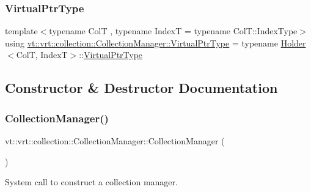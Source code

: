 \subsubsection{\texorpdfstring{Virtual\+Ptr\+Type}{VirtualPtrType}}
{\footnotesize\ttfamily template$<$typename ColT , typename IndexT  = typename Col\+T\+::\+Index\+Type$>$ \\
using \hyperlink{structvt_1_1vrt_1_1collection_1_1_collection_manager_a1da9015e52d6ecca955f57b59aab0b82}{vt\+::vrt\+::collection\+::\+Collection\+Manager\+::\+Virtual\+Ptr\+Type} =  typename \hyperlink{structvt_1_1vrt_1_1collection_1_1_holder}{Holder}$<$ColT, IndexT$>$\+::\hyperlink{structvt_1_1vrt_1_1collection_1_1_collection_manager_a1da9015e52d6ecca955f57b59aab0b82}{Virtual\+Ptr\+Type}}



\subsection{Constructor \& Destructor Documentation}
\mbox{\label{structvt_1_1vrt_1_1collection_1_1_collection_manager_ad6c6c75f1f54ae5470847311256ae8c3}} 
\subsubsection{\texorpdfstring{Collection\+Manager()}{CollectionManager()}}
{\footnotesize\ttfamily vt\+::vrt\+::collection\+::\+Collection\+Manager\+::\+Collection\+Manager (\begin{DoxyParamCaption}{ }\end{DoxyParamCaption})}



System call to construct a collection manager. 

\mbox{\label{structvt_1_1vrt_1_1collection_1_1_collection_manager_aea0c10371b37041bcc855eef0c767b85}} 
